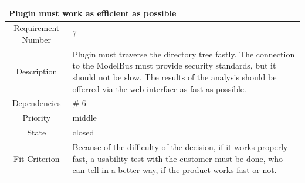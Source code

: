 \noindent\begin{minipage}{\linewidth}
\centering
\begin{tabular}{|c|p{10cm}|}
\hline 
\multicolumn{2}{|l|}{\textbf{Plugin must work as efficient as possible}} \\ 
\hline 
Requirement Number & 7 \\ \hline 
Description & Plugin must traverse the directory tree fastly. The connection to the ModelBus must provide security standards, but it should not be slow. The results of the analysis should be offerred via the web interface as fast as possible. \\ \hline 
Dependencies & \# 6 \\ \hline 
Priority & middle \\ \hline 
State & closed \\ \hline 
Fit Criterion & Because of the difficulty of the decision, if it works properly fast, a usability test with the customer must be done, who can tell in a better way, if the product works fast or not. \\ \hline 
\end{tabular}
\end{minipage}



